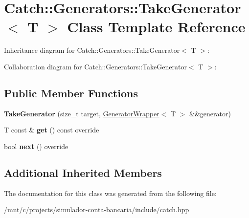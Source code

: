\hypertarget{classCatch_1_1Generators_1_1TakeGenerator}{}\section{Catch\+:\+:Generators\+:\+:Take\+Generator$<$ T $>$ Class Template Reference}
\label{classCatch_1_1Generators_1_1TakeGenerator}


Inheritance diagram for Catch\+:\+:Generators\+:\+:Take\+Generator$<$ T $>$\+:


Collaboration diagram for Catch\+:\+:Generators\+:\+:Take\+Generator$<$ T $>$\+:
\subsection*{Public Member Functions}
\begin{DoxyCompactItemize}
\item 
\mbox{\label{classCatch_1_1Generators_1_1TakeGenerator_aacef789c01a86246249c88a184268c65}} 
{\bfseries Take\+Generator} (size\+\_\+t target, \hyperlink{classCatch_1_1Generators_1_1GeneratorWrapper}{Generator\+Wrapper}$<$ T $>$ \&\&generator)
\item 
\mbox{\label{classCatch_1_1Generators_1_1TakeGenerator_aa4d2560f2066ec2eb4a351d62c107c78}} 
T const  \& {\bfseries get} () const override
\item 
\mbox{\label{classCatch_1_1Generators_1_1TakeGenerator_ae343f3e28fe04e0a20d6fdf69bfb4c78}} 
bool {\bfseries next} () override
\end{DoxyCompactItemize}
\subsection*{Additional Inherited Members}


The documentation for this class was generated from the following file\+:\begin{DoxyCompactItemize}
\item 
/mnt/c/projects/simulador-\/conta-\/bancaria/include/catch.\+hpp\end{DoxyCompactItemize}
